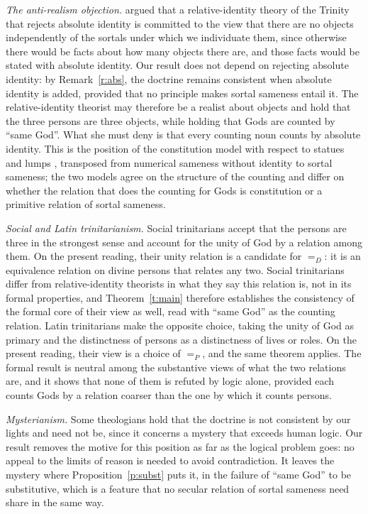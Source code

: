\documentclass{situationist-preprint}
\begin{document}
\emph{The anti-realism objection.} \citet{Rea2003} argued that a relative-identity theory of the Trinity that rejects absolute identity is committed to the view that there are no objects independently of the sortals under which we individuate them, since otherwise there would be facts about how many objects there are, and those facts would be stated with absolute identity. Our result does not depend on rejecting absolute identity: by Remark~\ref{r:abs}, the doctrine remains consistent when absolute identity is added, provided that no principle makes sortal sameness entail it. The relative-identity theorist may therefore be a realist about objects and hold that the three persons are three objects, while holding that Gods are counted by \enquote{same God}. What she must deny is that every counting noun counts by absolute identity. This is the position of the constitution model with respect to statues and lumps \citep{BrowerRea2005}, transposed from numerical sameness without identity to sortal sameness; the two models agree on the structure of the counting and differ on whether the relation that does the counting for Gods is constitution or a primitive relation of sortal sameness.

\emph{Social and Latin trinitarianism.} Social trinitarians \citep{Swinburne1994,Hasker2013} accept that the persons are three in the strongest sense and account for the unity of God by a relation among them. On the present reading, their unity relation is a candidate for $=_D$: it is an equivalence relation on divine persons that relates any two. Social trinitarians differ from relative-identity theorists in what they say this relation is, not in its formal properties, and Theorem~\ref{t:main} therefore establishes the consistency of the formal core of their view as well, read with \enquote{same God} as the counting relation. Latin trinitarians \citep{Leftow2004} make the opposite choice, taking the unity of God as primary and the distinctness of persons as a distinctness of lives or roles. On the present reading, their view is a choice of $=_P$, and the same theorem applies. The formal result is neutral among the substantive views of what the two relations are, and it shows that none of them is refuted by logic alone, provided each counts Gods by a relation coarser than the one by which it counts persons.

\emph{Mysterianism.} Some theologians hold that the doctrine is not consistent by our lights and need not be, since it concerns a mystery that exceeds human logic. Our result removes the motive for this position as far as the logical problem goes: no appeal to the limits of reason is needed to avoid contradiction. It leaves the mystery where Proposition~\ref{p:subst} puts it, in the failure of \enquote{same God} to be substitutive, which is a feature that no secular relation of sortal sameness need share in the same way.
\end{document}
